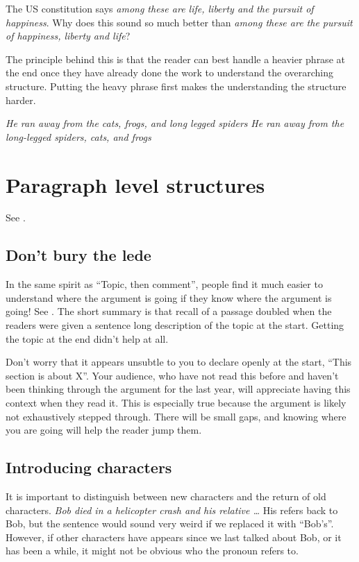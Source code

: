 \documentclass{article}
\newcommand{\example}[1]{\textit{#1}}
\begin{document}
The US constitution says \example{among these are life, liberty and the pursuit of happiness}. Why does this sound so much better than \example{among these are the pursuit of happiness, liberty and life}?

The principle behind this is that the reader can best handle a heavier phrase at the end once they have already done the work to understand the overarching structure.
Putting the heavy phrase first makes the understanding the structure harder.

\example{He ran away from the cats, frogs, and long legged spiders}
\example{He ran away from the long-legged spiders, cats, and frogs}

\section{Paragraph level structures}

See \citet[chapter 5][]{Pinker2014}.

\subsection{Don't bury the lede}

In the same spirit as ``Topic, then comment'', people find it much easier to understand where the argument is going if they know where the argument is going! See \cite{Bransford1972}. The short summary is that recall of a passage doubled when the readers were given a sentence long description of the topic at the start. Getting the topic at the end didn't help at all.

Don't worry that it appears unsubtle to you to declare openly at the start, ``This section is about X''. Your audience, who have not read this before and haven't been thinking through the argument for the last year, will appreciate having this context when they read it. This is especially true because the argument is likely not exhaustively stepped through. There will be small gaps, and knowing where you are going will help the reader jump them.


\subsection{Introducing characters}

It is important to distinguish between new characters and the return of old characters.
\example{Bob died in a helicopter crash and his relative \ldots}
His refers back to Bob, but the sentence would sound very weird if we replaced it with ``Bob's''.
However, if other characters have appears since we last talked about Bob, or it has been a while, it might not be obvious who the pronoun refers to.
\end{document}
